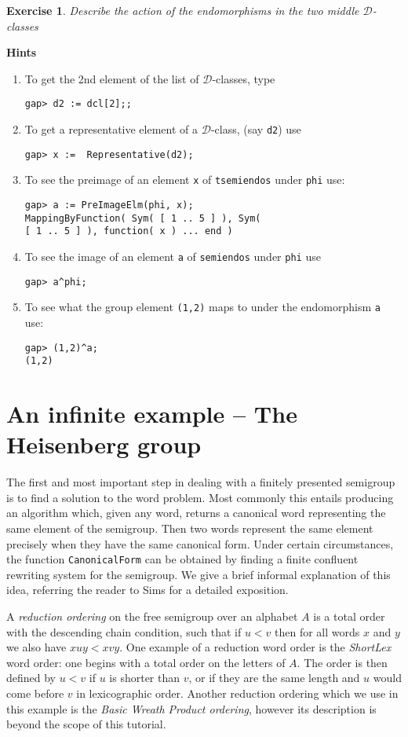 \documentclass{ws-p8-50x6-00}
\theoremstyle{plain} \newtheorem{Thm}{Theorem}
\theoremstyle{plain} \newtheorem{Cor}{Corollary}
\theoremstyle{plain} \newtheorem{Lemma}{Lemma}
\theoremstyle{plain} \newtheorem{Prop}{Proposition}
\theoremstyle{plain} \newtheorem{Ex}{Exercise}
\def\d{${\mathcal{D}}$}
\begin{document}
\begin{Ex}
Describe the action of the endomorphisms in the two middle  
$\mathcal{D}$-classes
\end{Ex}
{\bf Hints}
\begin{enumerate}
\item  To get the 2nd element of the list of \d-classes, type
\begin{verbatim}
gap> d2 := dcl[2];;
\end{verbatim}
\item To get a representative element of a \d-class, (say {\tt d2})
use 
\begin{verbatim}
gap> x :=  Representative(d2);
\end{verbatim}
\item To see the preimage of an element {\tt x} of {\tt tsemiendos} under
{\tt phi} use:
\begin{verbatim}
gap> a := PreImageElm(phi, x);     
MappingByFunction( Sym( [ 1 .. 5 ] ), Sym( 
[ 1 .. 5 ] ), function( x ) ... end )
\end{verbatim}
\item To see the image of an element {\tt a} of {\tt semiendos} under
{\tt phi} use 
\begin{verbatim}
gap> a^phi;
\end{verbatim}
\item To see what the group element {\tt (1,2)} 
maps to under the endomorphism {\tt a} use:
\begin{verbatim}
gap> (1,2)^a;
(1,2)
\end{verbatim}
\end{enumerate}


\section{An infinite example -- The Heisenberg group}
The first and most important step in dealing with a 
finitely presented semigroup is to find a solution to the word problem.  
Most commonly this entails producing an 
algorithm which, given any word, returns a canonical word representing the same
element of the semigroup. Then two words represent the same element precisely
when they have the same canonical form.
Under certain circumstances, the function {\tt CanonicalForm} can be 
obtained by finding a finite confluent rewriting system for the semigroup.
We give a brief informal explanation of this idea, 
referring the reader to Sims\cite{sims} for a detailed exposition.

A {\em  reduction ordering} on  the free semigroup over an alphabet
$A$ is a total order with the descending chain condition,  
such that if  $u < v$ then for all words 
$x$ and $y$ we also have $xuy < xvy$. One example of a reduction word 
order is the {\em ShortLex} word order: one begins with a total 
order on the letters of $A$. The order is then defined by 
$u < v$ if $u$ is shorter than $v$, or if they are the same length
and $u$ would come before $v$ in lexicographic order. Another
reduction ordering which we use in this example is the 
{\em Basic Wreath Product ordering}\cite{sims},
however its description is beyond the scope of this tutorial.
\end{document}

